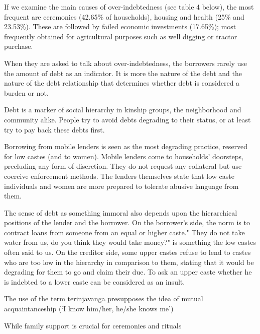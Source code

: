 \documentclass[a4paper, 11pt, onecolumn]{article}
\begin{document}
If we examine the main causes of over-indebtedness (see table 4 below), the most frequent are
ceremonies (42.65\% of households), housing and health (25\% and 23.53\%). These are
followed by failed economic investments (17.65\%); most frequently obtained for agricultural
purposes such as well digging or tractor purchase. 

When they are asked to talk about over-indebtedness, the borrowers rarely use
the amount of debt as an indicator. It is more the nature of the debt and the nature of the debt
relationship that determines whether debt is considered a burden or not.

Debt is a marker of social hierarchy in
kinship groups, the neighborhood and community alike. People try to avoid debts degrading
to their status, or at least try to pay back these debts first.

Borrowing from mobile lenders is seen as the most degrading practice, reserved for low castes
(and to women). Mobile lenders come to households’ doorsteps, precluding any form of
discretion. They do not request any collateral but use coercive enforcement methods. The
lenders themselves state that low caste individuals and women are more prepared to tolerate
abusive language from them.

The sense of debt as something immoral also depends upon the hierarchical positions of the
lender and the borrower. On the borrower’s side, the norm is to contract loans from someone
from an equal or higher caste." They do not take water from us, do you think they would take
money?" is something the low castes often said to us. On the creditor side, some upper castes
refuse to lend to castes who are too low in the hierarchy in comparison to them, stating that it
would be degrading for them to go and claim their due. To ask an upper caste whether he is
indebted to a lower caste can be considered as an insult.

The use of the term terinjavanga presupposes the idea of mutual
acquaintanceship (‘I know him/her, he/she knows me’)

While family support is crucial for
ceremonies and rituals
\end{document}
